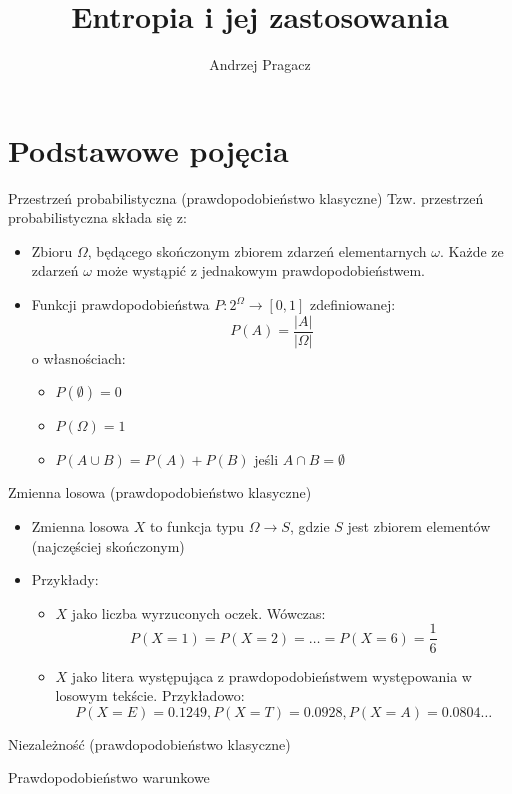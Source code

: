 \documentclass{beamer}
\title{Entropia i jej zastosowania}
\author{Andrzej Pragacz}
\begin{document}
\titlepage

\section{Podstawowe pojęcia}

\begin{frame}{Przestrzeń probabilistyczna (prawdopodobieństwo klasyczne)}
Tzw. przestrzeń probabilistyczna składa się z:
\begin{itemize}
  \item Zbioru $\Omega$, będącego skończonym zbiorem zdarzeń
  elementarnych $\omega$. Każde ze zdarzeń $\omega$ może wystąpić z jednakowym
  prawdopodobieństwem.
  \item Funkcji prawdopodobieństwa $P: 2^\Omega \to [0, 1]$ zdefiniowanej:
  $$
  P(A) = \frac{|A|}{|\Omega|}
  $$
  o własnościach:
  \begin{itemize}
    \item $P(\emptyset) = 0$
    \item $P(\Omega) = 1$
    \item $P(A \cup B) = P(A) + P(B)$ jeśli $A \cap B = \emptyset$
  \end{itemize}
\end{itemize}
\end{frame}

\begin{frame}{Zmienna losowa (prawdopodobieństwo klasyczne)}
\begin{itemize}
  \item Zmienna losowa $X$ to funkcja typu $\Omega \to S$, gdzie $S$ jest
  zbiorem elementów (najczęściej skończonym)
  \item Przykłady:
  \begin{itemize}
    \item $X$ jako liczba wyrzuconych oczek. Wówczas: $$P(X=1) = P(X=2) = \ldots = P(X=6) = \frac{1}{6}$$
    \item $X$ jako litera występująca z prawdopodobieństwem występowania
    w losowym tekście. Przykładowo:
    $$ P(X=E) = 0.1249, P(X=T) = 0.0928, P(X=A) = 0.0804 \ldots$$
  \end{itemize}
\end{itemize}
\end{frame}

\begin{frame}{Niezależność (prawdopodobieństwo klasyczne)}
\end{frame}

\begin{frame}{Prawdopodobieństwo warunkowe}
\end{frame}
\end{document}
